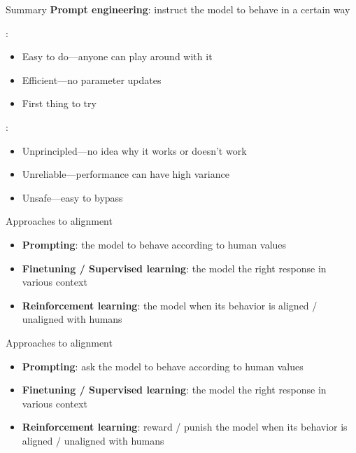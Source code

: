 \documentclass[usenames,dvipsnames,notes,11pt,aspectratio=169,hyperref={colorlinks=true, linkcolor=blue}]{beamer}
\begin{document}
\begin{frame}
    {Summary}
    \textbf{Prompt engineering}: instruct the model to behave in a certain way

    :\\
    \begin{itemize}
        \item Easy to do---anyone can play around with it 
        \item Efficient---no parameter updates
        \item First thing to try
    \end{itemize}

    \pause
    :\\
    \begin{itemize}
        \item Unprincipled---no idea why it works or doesn't work
        \item Unreliable---performance can have high variance 
        \item Unsafe---easy to bypass 
    \end{itemize}
\end{frame}

\begin{frame}
    {Approaches to alignment}
    \begin{itemize}
        \itemsep1em
        \item \textbf{Prompting}:  the model to behave according to human values
        \item \textbf{Finetuning / Supervised learning}:  the model the right response in various context
        \item \textbf{Reinforcement learning}:  the model when its behavior is aligned / unaligned with humans 
    \end{itemize}
\end{frame}

\begin{frame}
    {Approaches to alignment}
    \begin{itemize}
        \itemsep1em
            
        \item \textcolor{fg!20}{
                \textbf{Prompting}: {ask} the model to behave according to human values
        }
        \item \textbf{Finetuning / Supervised learning}:  the model the right response in various context
        \item \textcolor{fg!20}{
                \textbf{Reinforcement learning}: {reward / punish} the model when its behavior is aligned / unaligned with humans 
            }
    \end{itemize}
\end{frame}
\end{document}
